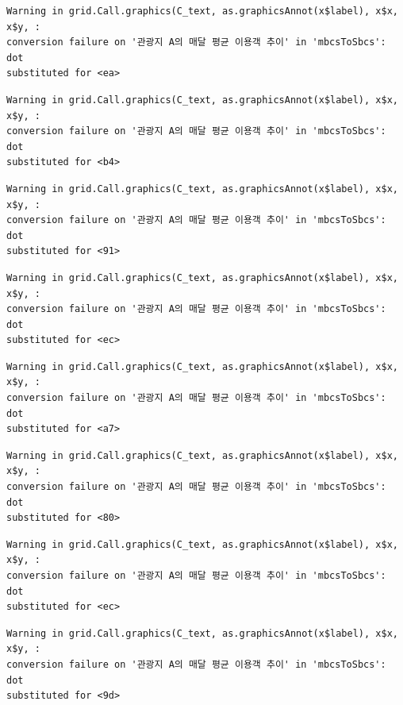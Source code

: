 \documentclass[
  letterpaper,
  DIV=11,
  numbers=noendperiod]{scrreprt}
\begin{document}
\begin{verbatim}
Warning in grid.Call.graphics(C_text, as.graphicsAnnot(x$label), x$x, x$y, :
conversion failure on '관광지 A의 매달 평균 이용객 추이' in 'mbcsToSbcs': dot
substituted for <ea>
\end{verbatim}

\begin{verbatim}
Warning in grid.Call.graphics(C_text, as.graphicsAnnot(x$label), x$x, x$y, :
conversion failure on '관광지 A의 매달 평균 이용객 추이' in 'mbcsToSbcs': dot
substituted for <b4>
\end{verbatim}

\begin{verbatim}
Warning in grid.Call.graphics(C_text, as.graphicsAnnot(x$label), x$x, x$y, :
conversion failure on '관광지 A의 매달 평균 이용객 추이' in 'mbcsToSbcs': dot
substituted for <91>
\end{verbatim}

\begin{verbatim}
Warning in grid.Call.graphics(C_text, as.graphicsAnnot(x$label), x$x, x$y, :
conversion failure on '관광지 A의 매달 평균 이용객 추이' in 'mbcsToSbcs': dot
substituted for <ec>
\end{verbatim}

\begin{verbatim}
Warning in grid.Call.graphics(C_text, as.graphicsAnnot(x$label), x$x, x$y, :
conversion failure on '관광지 A의 매달 평균 이용객 추이' in 'mbcsToSbcs': dot
substituted for <a7>
\end{verbatim}

\begin{verbatim}
Warning in grid.Call.graphics(C_text, as.graphicsAnnot(x$label), x$x, x$y, :
conversion failure on '관광지 A의 매달 평균 이용객 추이' in 'mbcsToSbcs': dot
substituted for <80>
\end{verbatim}

\begin{verbatim}
Warning in grid.Call.graphics(C_text, as.graphicsAnnot(x$label), x$x, x$y, :
conversion failure on '관광지 A의 매달 평균 이용객 추이' in 'mbcsToSbcs': dot
substituted for <ec>
\end{verbatim}

\begin{verbatim}
Warning in grid.Call.graphics(C_text, as.graphicsAnnot(x$label), x$x, x$y, :
conversion failure on '관광지 A의 매달 평균 이용객 추이' in 'mbcsToSbcs': dot
substituted for <9d>
\end{verbatim}
\end{document}
